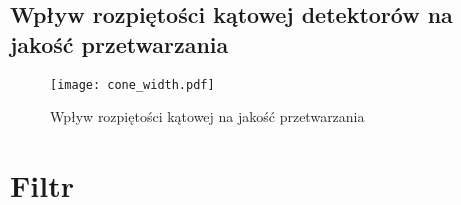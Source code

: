 \documentclass{article}
\begin{document}
\subsection{Wpływ rozpiętości kątowej detektorów na jakość przetwarzania}
\label{subsec_cone_width_comparison}


\begin{figure}[!htbp]
\begin{center}
\texttt{[image: cone\_width.pdf]}
\end{center}
\caption{Wpływ rozpiętości kątowej na jakość przetwarzania}
\label{fig:detectors_amount}
\end{figure}

\section{Filtr}




\end{document}
